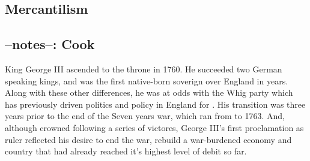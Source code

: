 \subsection{Mercantilism}

\subsection{--notes--: Cook}

King George III ascended to the throne in 1760. He succeeded two German
speaking kings, and was the first native-born soverign over England in
 years. Along with these other differences, he was at odds with the
Whig party which has previously driven politics and policy in England for
. His transition was three years prior to the end of the Seven
years war, which ran from  to 1763. And, although crowned following a
series of victores, George III's first proclamation as ruler reflected his
desire to end the war, rebuild a war-burdened economy and country that had
already reached it's highest level of debit so far.


